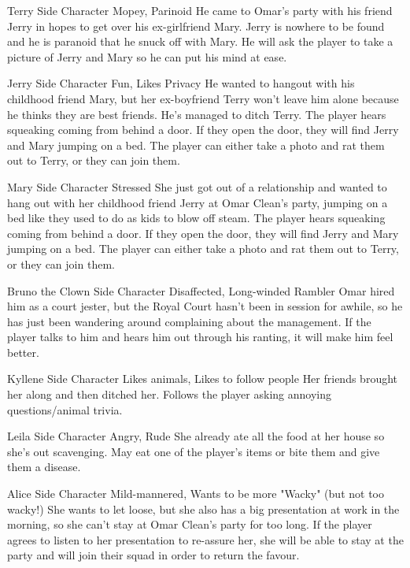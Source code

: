 {Terry}
{Side Character}
{Mopey, Parinoid}
{He came to Omar's party with his friend Jerry in hopes to get over his ex-girlfriend Mary.}
{Jerry is nowhere to be found and he is paranoid that he snuck off with Mary. He will ask the player to take a picture of Jerry and Mary so he can put his mind at ease.}

{Jerry}
{Side Character}
{Fun, Likes Privacy}
{He wanted to hangout with his childhood friend Mary, but her ex-boyfriend Terry won't leave him alone because he thinks they are best friends. He's managed to ditch Terry.}
{The player hears squeaking coming from behind a door. If they open the door, they will find Jerry and Mary jumping on a bed. The player can either take a photo and rat them out to Terry, or they can join them.}

{Mary}
{Side Character}
{Stressed}
{She just got out of a relationship and wanted to hang out with her childhood friend Jerry at Omar Clean's party, jumping on a bed like they used to do as kids to blow off steam.}
{The player hears squeaking coming from behind a door. If they open the door, they will find Jerry and Mary jumping on a bed. The player can either take a photo and rat them out to Terry, or they can join them.}

{Bruno the Clown}
{Side Character}
{Disaffected, Long-winded Rambler}
{Omar hired him as a court jester, but the Royal Court hasn't been in session for awhile, so he has just been wandering around complaining about the management.}
{If the player talks to him and hears him out through his ranting, it will make him feel better.}

{Kyllene}
{Side Character}
{Likes animals, Likes to follow people}
{Her friends brought her along and then ditched her.}
{Follows the player asking annoying questions/animal trivia.}

{Leila}
{Side Character}
{Angry, Rude}
{She already ate all the food at her house so she's out scavenging.}
{May eat one of the player's items or bite them and give them a disease.}

{Alice}
{Side Character}
{Mild-mannered, Wants to be more "Wacky" (but not too wacky!)}
{She wants to let loose, but she also has a big presentation at work in the morning, so she can't stay at Omar Clean's party for too long.}
{If the player agrees to listen to her presentation to re-assure her, she will be able to stay at the party and will join their squad in order to return the favour.}

